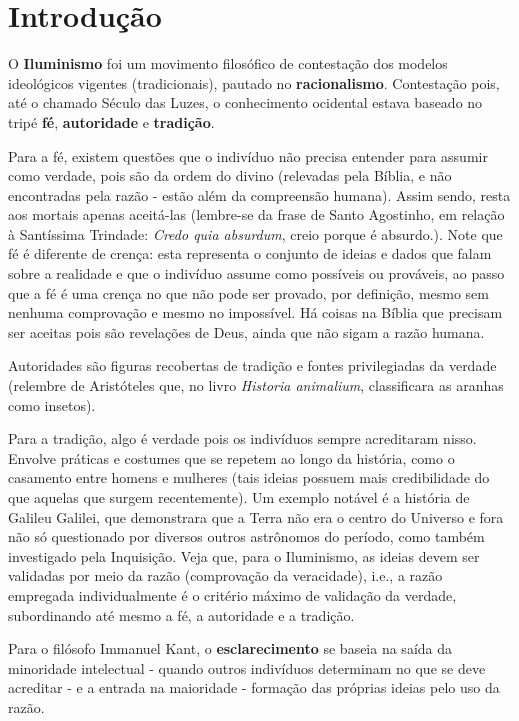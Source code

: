 
\chapter{Introdução}

O \textbf{Iluminismo} foi um movimento filosófico de contestação dos modelos ideológicos vigentes (tradicionais), pautado no \textbf{racionalismo}. Contestação pois, até o chamado Século das Luzes, o conhecimento ocidental estava baseado no tripé \textbf{fé}, \textbf{autoridade} e \textbf{tradição}.

Para a fé, existem questões que o indivíduo não precisa entender para assumir como verdade, pois são da ordem do divino (relevadas pela Bíblia, e não encontradas pela razão - estão além da compreensão humana). Assim sendo, resta aos mortais apenas aceitá-las (lembre-se da frase de Santo Agostinho, em relação à Santíssima Trindade: \textit{Credo quia absurdum}, creio porque é absurdo.). Note que fé é diferente de crença: esta representa o conjunto de ideias e dados que falam sobre a realidade e que o indivíduo assume como possíveis ou prováveis, ao passo que a fé é uma crença no que não pode ser provado, por definição, mesmo sem nenhuma comprovação e mesmo no impossível. Há coisas na Bíblia que precisam ser aceitas pois são revelações de Deus, ainda que não sigam a razão humana.

Autoridades são figuras recobertas de tradição e fontes privilegiadas da verdade (relembre de Aristóteles que, no livro \textit{Historia animalium}, classificara as aranhas como insetos).

Para a tradição, algo é verdade pois os indivíduos sempre acreditaram nisso. Envolve práticas e costumes que se repetem ao longo da história, como o casamento entre homens e mulheres (tais ideias possuem mais credibilidade do que aquelas que surgem recentemente). Um exemplo notável é a história de Galileu Galilei, que demonstrara que a Terra não era o centro do Universo e fora não só questionado por diversos outros astrônomos do período, como também investigado pela Inquisição. Veja que, para o Iluminismo, as ideias devem ser validadas por meio da razão (comprovação da veracidade), i.e., a razão empregada individualmente é o critério máximo de validação da verdade, subordinando até mesmo a fé, a autoridade e a tradição.

Para o filósofo Immanuel Kant, o \textbf{esclarecimento} se baseia na saída da minoridade intelectual - quando outros indivíduos determinam no que se deve acreditar - e a entrada na maioridade - formação das próprias ideias pelo uso da razão.

